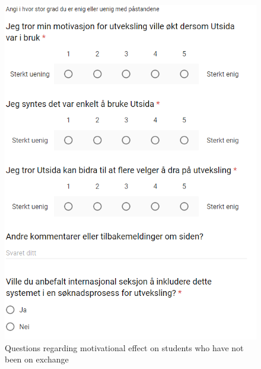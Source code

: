 \begin{figure}[h]
    \centering
    \includegraphics[width=1\textwidth]{fig/form2/s3.PNG}
    \caption{Questions regarding motivational effect on students who have not been on exchange}
    \label{fig:my_label}
\end{figure}
